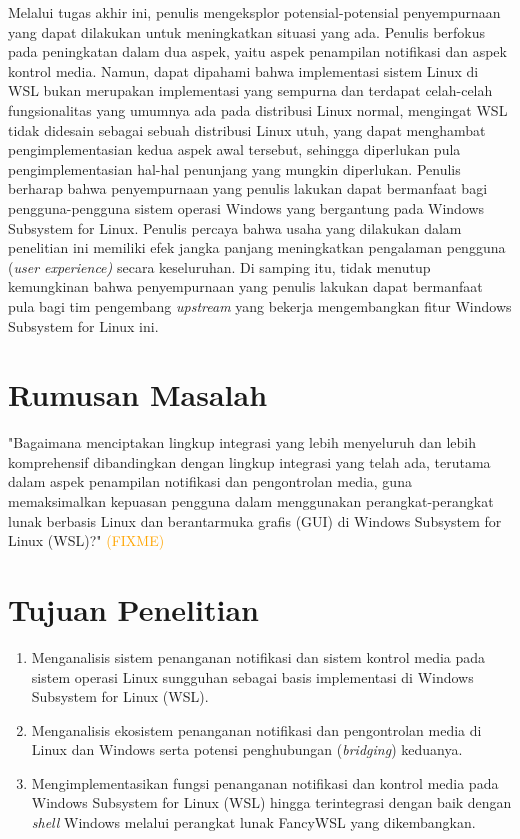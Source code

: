 Melalui tugas akhir ini, penulis mengeksplor potensial-potensial penyempurnaan yang dapat dilakukan untuk meningkatkan situasi yang ada. Penulis berfokus pada peningkatan dalam dua aspek, yaitu aspek penampilan notifikasi dan aspek kontrol media. Namun, dapat dipahami bahwa implementasi sistem Linux di WSL bukan merupakan implementasi yang sempurna dan terdapat celah-celah fungsionalitas yang umumnya ada pada distribusi Linux normal, mengingat WSL tidak didesain sebagai sebuah distribusi Linux utuh, yang dapat menghambat pengimplementasian kedua aspek awal tersebut, sehingga diperlukan pula pengimplementasian hal-hal penunjang yang mungkin diperlukan. Penulis berharap bahwa penyempurnaan yang penulis lakukan dapat bermanfaat bagi pengguna-pengguna sistem operasi Windows yang bergantung pada Windows Subsystem for Linux. Penulis percaya bahwa usaha yang dilakukan dalam penelitian ini memiliki efek jangka panjang meningkatkan pengalaman pengguna (\textit{user experience)} secara keseluruhan. Di samping itu, tidak menutup kemungkinan bahwa penyempurnaan yang penulis lakukan dapat bermanfaat pula bagi tim pengembang \textit{upstream} yang bekerja mengembangkan fitur Windows Subsystem for Linux ini.


\section{Rumusan Masalah}

"Bagaimana menciptakan lingkup integrasi yang lebih menyeluruh dan lebih komprehensif dibandingkan dengan lingkup integrasi yang telah ada, terutama dalam aspek penampilan notifikasi dan pengontrolan media, guna memaksimalkan kepuasan pengguna dalam menggunakan perangkat-perangkat lunak berbasis Linux dan berantarmuka grafis (GUI) di Windows Subsystem for Linux (WSL)?" \textcolor{orange}{(FIXME)}


\section{Tujuan Penelitian}

\begin{enumerate}
    \item Menganalisis sistem penanganan notifikasi dan sistem kontrol media pada sistem operasi Linux sungguhan sebagai basis implementasi di Windows Subsystem for Linux (WSL).

    \item Menganalisis ekosistem penanganan notifikasi dan pengontrolan media di Linux dan Windows serta potensi penghubungan (\textit{bridging}) keduanya.

    \item Mengimplementasikan fungsi penanganan notifikasi dan kontrol media pada Windows Subsystem for Linux (WSL) hingga terintegrasi dengan baik dengan \textit{shell} Windows melalui perangkat lunak FancyWSL yang dikembangkan.
\end{enumerate}


